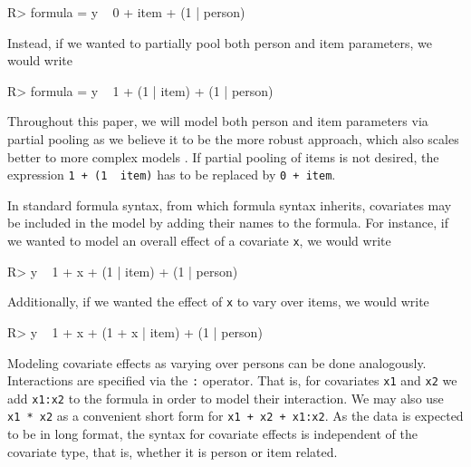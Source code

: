 \documentclass[jss]{jss}
\begin{document}
\begin{CodeChunk}

\begin{CodeInput}
R> formula = y ~ 0 + item + (1 | person)
\end{CodeInput}
\end{CodeChunk}

Instead, if we wanted to partially pool both person and item parameters,
we would write

\begin{CodeChunk}

\begin{CodeInput}
R> formula = y ~ 1 + (1 | item) + (1 | person)
\end{CodeInput}
\end{CodeChunk}

Throughout this paper, we will model both person and item parameters via
partial pooling as we believe it to be the more robust approach, which
also scales better to more complex models \citep{gelmanMLM2006}. If
partial pooling of items is not desired, the expression
\texttt{1\ +\ (1\ \textbar{}\ item)} has to be replaced by
\texttt{0\ +\ item}.

In standard  formula syntax, from which  formula
syntax inherits, covariates may be included in the model by adding their
names to the formula. For instance, if we wanted to model an overall
effect of a covariate \texttt{x}, we would write

\begin{CodeChunk}

\begin{CodeInput}
R> y ~ 1 + x + (1 | item) + (1 | person)
\end{CodeInput}
\end{CodeChunk}

Additionally, if we wanted the effect of \texttt{x} to vary over items,
we would write

\begin{CodeChunk}

\begin{CodeInput}
R> y ~ 1 + x + (1 + x | item) + (1 | person)
\end{CodeInput}
\end{CodeChunk}

Modeling covariate effects as varying over persons can be done
analogously. Interactions are specified via the \texttt{:} operator.
That is, for covariates \texttt{x1} and \texttt{x2} we add
\texttt{x1:x2} to the formula in order to model their interaction. We
may also use \texttt{x1\ *\ x2} as a convenient short form for
\texttt{x1\ +\ x2\ +\ x1:x2}. As the data is expected to be in long
format, the syntax for covariate effects is independent of the covariate
type, that is, whether it is person or item related.
\end{document}
